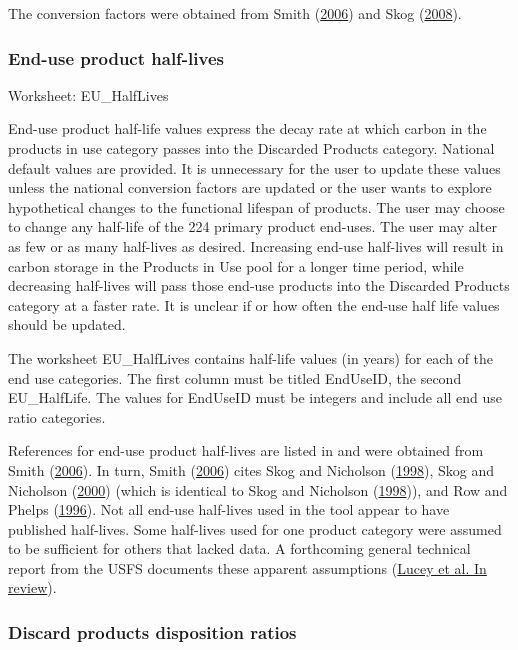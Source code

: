 \documentclass[
  openany]{book}
\begin{document}
The conversion factors were obtained from Smith
(\protect\hyperlink{ref-smith2006}{2006}) and Skog
(\protect\hyperlink{ref-skog2008}{2008}).

\hypertarget{own-prov-input-euhl}{%
\subsubsection{End-use product half-lives}\label{own-prov-input-euhl}}

Worksheet: EU\_HalfLives

End-use product half-life values express the decay rate at which carbon
in the products in use category passes into the Discarded Products
category. National default values are provided. It is unnecessary for
the user to update these values unless the national conversion factors
are updated or the user wants to explore hypothetical changes to the
functional lifespan of products. The user may choose to change any
half-life of the 224 primary product end-uses. The user may alter as few
or as many half-lives as desired. Increasing end-use half-lives will
result in carbon storage in the Products in Use pool for a longer time
period, while decreasing half-lives will pass those end-use products
into the Discarded Products category at a faster rate. It is unclear if
or how often the end-use half life values should be updated.

The worksheet EU\_HalfLives contains half-life values (in years) for
each of the end use categories. The first column must be titled
EndUseID, the second EU\_HalfLife. The values for EndUseID must be
integers and include all end use ratio categories.

References for end-use product half-lives are listed in and were
obtained from Smith (\protect\hyperlink{ref-smith2006}{2006}). In turn,
Smith (\protect\hyperlink{ref-smith2006}{2006}) cites Skog and Nicholson
(\protect\hyperlink{ref-skog1998}{1998}), Skog and Nicholson
(\protect\hyperlink{ref-skog2000}{2000}) (which is identical to Skog and
Nicholson (\protect\hyperlink{ref-skog1998}{1998})), and Row and Phelps
(\protect\hyperlink{ref-row1996}{1996}). Not all end-use half-lives used
in the tool appear to have published half-lives. Some half-lives used
for one product category were assumed to be sufficient for others that
lacked data. A forthcoming general technical report from the USFS
documents these apparent assumptions
(\protect\hyperlink{ref-lucey202X}{Lucey et al. In review}).

\hypertarget{own-prov-input-discFates}{%
\subsubsection{Discard products disposition
ratios}\label{own-prov-input-discFates}}
\end{document}
